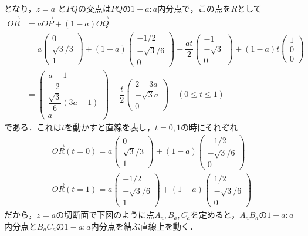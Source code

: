 \documentclass[../../main.tex]{subfiles}
\begin{document}
となり，$z=a$ と$PQ$の交点は$PQ$の$1-a : a$内分点で，この点を$R$として
\begin{align}
  \overrightarrow{OR} &= a \overrightarrow{OP} + (1-a) \overrightarrow{OQ} \\
  &= a
  \begin{pmatrix} 0 \\ \sqrt{3}/3 \\ 1
  \end{pmatrix} + (1-a)
  \begin{pmatrix} -1/2 \\ -\sqrt{3}/6 \\ 0
  \end{pmatrix} + \dfrac{at}{2}
  \begin{pmatrix} -1 \\ -\sqrt{3} \\ 0
  \end{pmatrix} + (1-a)t
  \begin{pmatrix} 1 \\ 0 \\ 0
  \end{pmatrix} \\
  &=
  \begin{pmatrix} \dfrac{a-1}{2} \\ \dfrac{\sqrt{3}}{6}(3a-1) \\ a
  \end{pmatrix} + \dfrac{t}{2}
  \begin{pmatrix} 2-3a \\ -\sqrt{3}a \\ 0
  \end{pmatrix} \quad (0 \le t \le 1)
\end{align}
である．これは$t$を動かすと直線を表し，$t=0,1$の時にそれぞれ
\begin{align}
  \overrightarrow{OR}(t=0) =  a
  \begin{pmatrix} 0 \\ \sqrt{3}/3 \\ 1
  \end{pmatrix} + (1-a)
  \begin{pmatrix} -1/2 \\ -\sqrt{3}/6 \\ 0
  \end{pmatrix}  \\
  \overrightarrow{OR}(t=1) =  a
  \begin{pmatrix} -1/2 \\ -\sqrt{3}/6 \\ 1
  \end{pmatrix} + (1-a)
  \begin{pmatrix} 1/2 \\ -\sqrt{3}/6 \\ 0
  \end{pmatrix}
\end{align}
だから，$z=a$の切断面で下図のように点$A_a,B_a,C_a$を定めると，$A_aB_a$の$1-a:a$内分点と$B_aC_a$の$1-a:a$内分点を結ぶ直線上を動く．
\end{document}
